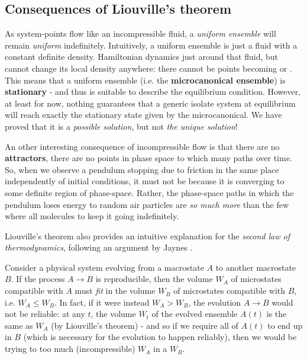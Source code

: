\documentclass[../../main.tex]{subfiles}
\begin{document}
\subsection{Consequences of Liouville's theorem}
As system-points flow like an incompressible fluid, a \textit{uniform ensemble} will remain \textit{uniform} indefinitely. Intuitively, a uniform ensemble is just a fluid with a constant definite density. Hamiltonian dynamics just  around that fluid, but cannot change its local density anywhere: there cannot be points becoming  or . This means that a uniform ensemble (i.e. the \textbf{microcanonical ensemble}) is \textbf{stationary} - and thus is suitable to describe the equilibrium condition. However, at least for now, nothing guarantees that a generic isolate system at equilibrium will reach exactly the stationary state given by the microcanonical. We have proved that it is a \textit{possible solution}, but not \textit{the unique solution}!

\medskip

An other interesting consequence of incompressible flow is that there are no \textbf{attractors}, there are no points in phase space to which many paths  over time. So, when we observe a pendulum stopping due to friction in the same place independently of initial conditions, it must not be because it is converging to some definite region of phase-space. Rather, the phase-space paths in which the pendulum loses energy to random air particles are \textit{so much more} than the few where all molecules  to keep it going indefinitely.  

\medskip

Liouville's theorem also provides an intuitive explanation for the \textit{second law of thermodynamics}, following an argument by Jaynes \cite{jaynes-secondlaw}\cite{jaynes2}.

Consider a physical system evolving from a macrostate $A$ to another macrostate $B$. If the process $A \to B$ is reproducible, then the volume $W_A$ of microstates compatible with $A$ must \textit{fit} in the volume $W_B$ of microstates compatible with $B$, i.e. $W_A \leq W_B$. In fact, if it were instead $W_A > W_B$, the evolution $A \to B$ would not be reliable: at any $t$, the volume $W_t$ of the evolved ensemble $A(t)$ is the same as $W_A$ (by Liouville's theorem) - and so 
if we require all of $A(t)$ to end up in $B$ (which is necessary for the evolution to happen reliably), then we would be trying to  too much (incompressible)  $W_A$ in a  $W_B$.
\end{document}
